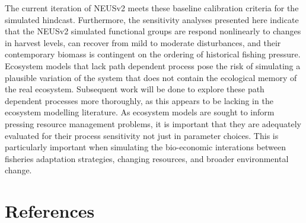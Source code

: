 \documentclass[
]{article}
\begin{document}
The current iteration of NEUSv2 meets these baseline calibration criteria for the simulated hindcast. Furthermore, the sensitivity analyses presented here indicate that the NEUSv2 simulated functional groups are respond nonlinearly to changes in harvest levels, can recover from mild to moderate disturbances, and their contemporary biomass is contingent on the ordering of historical fishing pressure. Ecosystem models that lack path dependent process pose the risk of simulating a plausible variation of the system that does not contain the ecological memory of the real ecosystem. Subsequent work will be done to explore these path dependent processes more thoroughly, as this appears to be lacking in the ecosystem modelling literature. As ecosystem models are sought to inform pressing resource management problems, it is important that they are adequately evaluated for their process sensitivity not just in parameter choices. This is particularly important when simulating the bio-economic interations between fisheries adaptation strategies, changing resources, and broader environmental change.

\clearpage
\FloatBarrier

\section{References}\label{references}
\end{document}
